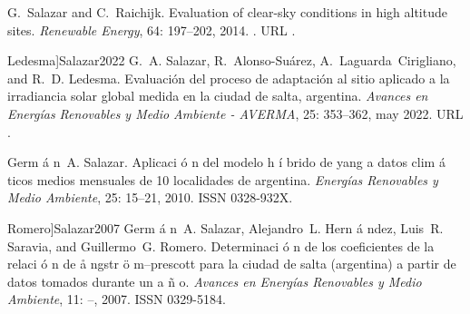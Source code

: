 \documentclass[letterpaper,12pt, twoside]{report}
\providecommand{\DIFdeltex}[1]{{\protect\color{red} \scriptsize #1}} %
\providecommand{\DIFdel}[1]{\texorpdfstring{\DIFdeltex{#1}}{}} %
\begin{document}
\DIFdel{G.~Salazar and C.~Raichijk.
}%
\DIFdel{Evaluation of clear-sky conditions in high altitude sites.
}%
\DIFdel{\emph{Renewable Energy}, 64:}%
\DIFdel{197--202, 2014.
}%
\DIFdel{.
}%
\DIFdel{URL }%
\DIFdel{.
}%

  Ledesma]{Salazar2022}
\DIFdel{G.~A. Salazar, R.~Alonso-Suárez, A.~Laguarda~Cirigliano, and R.~D. Ledesma.
}%
\DIFdel{Evaluación del proceso de adaptación al sitio aplicado a la
  irradiancia solar global medida en la ciudad de salta, argentina.
}%
\DIFdel{\emph{Avances en Energías Renovables y Medio Ambiente - AVERMA},
  25:}%
\DIFdel{353–362, may 2022.
}%
\DIFdel{URL
  }%
\DIFdel{.
}%

\DIFdel{Germ}%
\DIFdel{\'a}%
\DIFdel{n~A. Salazar.
}%
\DIFdel{Aplicaci}%
\DIFdel{\'o}%
\DIFdel{n del modelo h}%
\DIFdel{\'i}%
\DIFdel{brido de yang a datos clim}%
\DIFdel{\'a}%
\DIFdel{ticos
  medios mensuales de 10 localidades de argentina.
}%
\DIFdel{\emph{Energ{\'i}as Renovables y Medio Ambiente}, 25:}%
\DIFdel{15--21,
  2010.
}%
\DIFdel{ISSN 0328-932X.
}%

  Romero]{Salazar2007}
\DIFdel{Germ}%
\DIFdel{\'a}%
\DIFdel{n~A. Salazar, Alejandro~L. Hern}%
\DIFdel{\'a}%
\DIFdel{ndez, Luis~R. Saravia, and
  Guillermo~G. Romero.
}%
\DIFdel{Determinaci}%
\DIFdel{\'o}%
\DIFdel{n de los coeficientes de la relaci}%
\DIFdel{\'o}%
\DIFdel{n de
  }%
\DIFdel{\aa}%
\DIFdel{ngstr}%
\DIFdel{\"o}%
\DIFdel{m–prescott para la ciudad de salta (argentina) a partir de
  datos tomados durante un a}%
\DIFdel{\~n}%
\DIFdel{o.
}%
\DIFdel{\emph{Avances en Energ{\'i}as Renovables y Medio Ambiente},
  11:}%
\DIFdel{--, 2007.
}%
\DIFdel{ISSN 0329-5184.
}%
\end{document}
